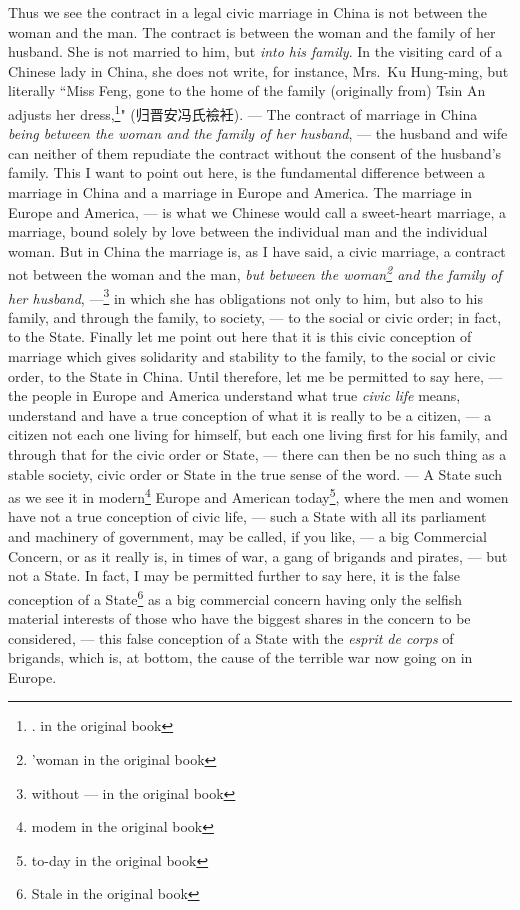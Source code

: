Thus we see the contract in a legal civic marriage in China is not between the woman and the man.
The contract is between the woman and the family of her husband.
She is not married to him, but \emph{into his family}.
In the visiting card of a Chinese lady in China, she does not write, for instance, Mrs.~Ku Hung-ming, but literally ``Miss Feng, gone to the home of the family (originally from) Tsin An adjusts her dress,\footnote{. in the original book}" (归晋安冯氏襝衽).
--- The contract of marriage in China \emph{being between the woman and the family of her husband}, --- the husband and wife can neither of them repudiate the contract without the consent of the husband's family.
This I want to point out here, is the fundamental difference between a marriage in China and a marriage in Europe and America.
The marriage in Europe and America, --- is what we Chinese would call a sweet-heart marriage, a marriage, bound solely by love between the individual man and the individual woman.
But in China the marriage is, as I have said, a civic marriage, a contract not between the woman and the man, \emph{but between the woman\footnote{'woman in the original book} and the family of her husband}, ---\footnote{without --- in the original book} in which she has obligations not only to him, but also to his family, and through the family, to society, --- to the social or civic order; in fact, to the State.
Finally let me point out here that it is this civic conception of marriage which gives solidarity and stability to the family, to the social or civic order, to the State in China. 
Until therefore, let me be permitted to say here, --- the people in Europe and America understand what true \emph{civic life} means, understand and have a true conception of what it is really to be a citizen, --- a citizen not each one living for himself, but each one living first for his family, and through that for the civic order or State, --- there can then be no such thing as a stable society, civic order or State in the true sense of the word.
--- A State such as we see it in modern\footnote{modem in the original book} Europe and American today\footnote{to-day in the original book}, where the men and women have not a true conception of civic life, --- such a State with all its parliament and machinery of government, may be called, if you like, --- a big Commercial Concern, or as it really is, in times of war, a gang of brigands and pirates, --- but not a State.
In fact, I may be permitted further to say here, it is the false conception of a State\footnote{Stale in the original book} as a big commercial concern having only the selfish material interests of those who have the biggest shares in the concern to be considered, --- this false conception of a State with the \emph{esprit de corps} of brigands, which is, at bottom, the cause of the terrible war now going on in Europe.

